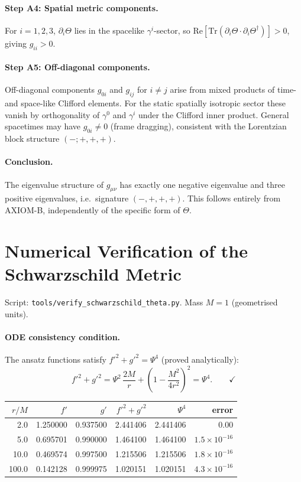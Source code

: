 \documentclass[12pt,a4paper]{article}
\theoremstyle{definition}
\theoremstyle{remark}
\newcommand{\Tr}{\mathrm{Tr}}
\newcommand{\re}{\mathrm{Re}}
\begin{document}
\paragraph{Step A4: Spatial metric components.}
For $i = 1,2,3$, $\partial_i\Theta$ lies in the spacelike $\gamma^i$-sector,
so $\re[\Tr(\partial_i\Theta \cdot \partial_i\Theta^\dagger)] > 0$,
giving $g_{ii} > 0$.

\paragraph{Step A5: Off-diagonal components.}
Off-diagonal components $g_{0i}$ and $g_{ij}$ for $i \neq j$ arise from
mixed products of time- and space-like Clifford elements.
For the static spatially isotropic sector these vanish by orthogonality
of $\gamma^0$ and $\gamma^i$ under the Clifford inner product.
General spacetimes may have $g_{0i} \neq 0$ (frame dragging), consistent
with the Lorentzian block structure $(-;+,+,+)$.

\paragraph{Conclusion.}
The eigenvalue structure of $g_{\mu\nu}$ has exactly one negative eigenvalue
and three positive eigenvalues, i.e.\ signature $(-,+,+,+)$.
This follows entirely from AXIOM-B, independently of the specific form of $\Theta$.

\section{Numerical Verification of the Schwarzschild Metric}
\label{app:numerics}

Script: \texttt{tools/verify\_schwarzschild\_theta.py}.
Mass $M = 1$ (geometrised units).

\paragraph{ODE consistency condition.}
The ansatz functions satisfy $f'^2 + g'^2 = \Psi^4$ (proved analytically):
\[
  f'^2 + g'^2
  = \Psi^2\,\frac{2M}{r} + \left(1 - \frac{M^2}{4r^2}\right)^2
  = \Psi^4. \qquad \checkmark
\]

\begin{center}
\begin{tabular}{rrrrrr}
\toprule
$r/M$ & $f'$ & $g'$ & $f'^2+g'^2$ & $\Psi^4$ & error \\
\midrule
2.0   & 1.250000 & 0.937500 & 2.441406 & 2.441406 & $0.00$               \\
5.0   & 0.695701 & 0.990000 & 1.464100 & 1.464100 & $1.5\times10^{-16}$  \\
10.0  & 0.469574 & 0.997500 & 1.215506 & 1.215506 & $1.8\times10^{-16}$  \\
100.0 & 0.142128 & 0.999975 & 1.020151 & 1.020151 & $4.3\times10^{-16}$  \\
\bottomrule
\end{tabular}
\end{center}
\end{document}

